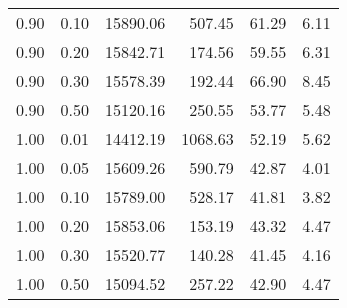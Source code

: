 \begin{table}
\begin{tabular}{rrrrrr}
0.90 & 0.10 & 15890.06 & 507.45 & 61.29 & 6.11 \\
0.90 & 0.20 & 15842.71 & 174.56 & 59.55 & 6.31 \\
0.90 & 0.30 & 15578.39 & 192.44 & 66.90 & 8.45 \\
0.90 & 0.50 & 15120.16 & 250.55 & 53.77 & 5.48 \\
1.00 & 0.01 & 14412.19 & 1068.63 & 52.19 & 5.62 \\
1.00 & 0.05 & 15609.26 & 590.79 & 42.87 & 4.01 \\
1.00 & 0.10 & 15789.00 & 528.17 & 41.81 & 3.82 \\
1.00 & 0.20 & 15853.06 & 153.19 & 43.32 & 4.47 \\
1.00 & 0.30 & 15520.77 & 140.28 & 41.45 & 4.16 \\
1.00 & 0.50 & 15094.52 & 257.22 & 42.90 & 4.47 \\
\bottomrule
\end{tabular}
\end{table}
